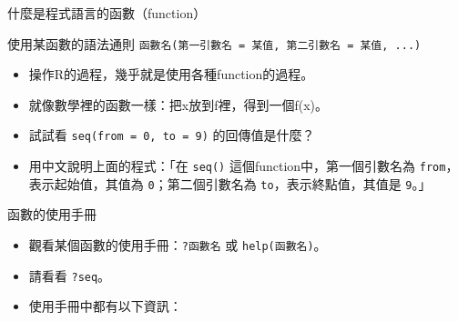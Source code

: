 \documentclass[12pt]{beamer}
\begin{document}
\begin{frame}[fragile]{什麼是程式語言的函數（function）}

\begin{block}{使用某函數的語法通則}
\verb+函數名(第一引數名 = 某值, 第二引數名 = 某值, ...)+ 
\end{block}

\begin{itemize}
\item 操作R的過程，幾乎就是使用各種function的過程。
\item 就像數學裡的函數一樣：把x放到f裡，得到一個f(x)。
\item 試試看 \verb+seq(from = 0, to = 9)+ 的回傳值是什麼？
\item 用中文說明上面的程式：「在 \verb+seq()+ 這個function中，第一個引數名為 \verb+from+，表示起始值，其值為 \verb+0+；第二個引數名為 \verb+to+，表示終點值，其值是 \verb+9+。」
\end{itemize}
\end{frame}



\begin{frame}[fragile]{函數的使用手冊}
\begin{itemize}
\item 觀看某個函數的使用手冊：\verb+?函數名+ 或 \verb+help(函數名)+。
\item 請看看 \verb+?seq+。
\item 使用手冊中都有以下資訊：
\end{itemize}
\end{frame}
\end{document}
